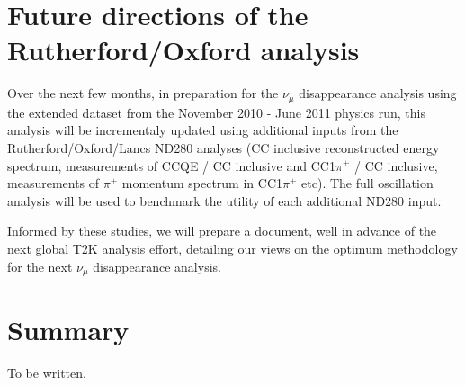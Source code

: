 \section {Future directions of the Rutherford/Oxford analysis}
\label{sec:future}

Over the next few months, 
in preparation for the $\nu_{\mu}$ disappearance analysis using the extended dataset from the November 2010 - June 2011 physics run, 
this analysis will be incrementaly updated using additional inputs from the Rutherford/Oxford/Lancs ND280 analyses 
(CC inclusive reconstructed energy spectrum, measurements of CCQE / CC inclusive and CC1$\pi^{+}$ / CC inclusive, 
measurements of $\pi^{+}$ momentum spectrum in CC1$\pi^{+}$ etc).
The full oscillation analysis will be used to benchmark the utility of each additional ND280 input.

Informed by these studies, we will prepare a document, well in advance of the next global T2K analysis effort,
detailing our views on the optimum methodology for the next $\nu_{\mu}$ disappearance analysis.

\section {Summary}
\label{sec:summary}

To be written.
